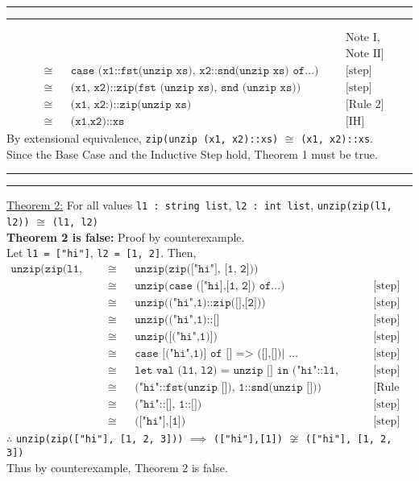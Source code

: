 \documentclass[11pt]{article}
\newcounter{questionCounter}
\newcounter{partCounter}[questionCounter]
\newenvironment{question}[2][\arabic{questionCounter}]{%
    \setcounter{partCounter}{0}%
    \vspace{.25in} \hrule \vspace{0.5em}%
        \noindent{\bf #2}%
    \vspace{0.8em} \hrule \vspace{.10in}%
    \addtocounter{questionCounter}{1}%
}{}
\begin{document}
\begin{question}{Task 2.1}
\begin{align*}
    & && &&& \text{Note I,}\\
    & && &&& \text{Note II]}\\
    &\cong && \texttt{case (x1::fst(unzip xs), x2::snd(unzip xs) of}\dots\texttt{)} &&& \text{[step]}\\
    &\cong && \texttt{(x1, x2)::zip(fst (unzip xs), snd (unzip xs))} &&& \text{[step]}\\
    &\cong && \texttt{(x1, x2:)::zip(unzip xs)} &&& \text{[Rule 2]}\\
    &\cong && \texttt{(x1,x2)::xs} &&& \text{[IH]}
\end{align*}
By extensional equivalence, \verb!zip(unzip (x1, x2)::xs)! $\cong$ \verb!(x1, x2)::xs!.\\
Since the Base Case and the Inductive Step hold, Theorem 1 must be true.
\end{question}

\newpage

\begin{question}{Task 2.2}
\underline{Theorem 2:} For all values \verb!l1 : string list!, \verb!l2 : int list!, \verb!unzip(zip(l1, l2))! $\cong$ \verb!(l1, l2)!\\
\textbf{Theorem 2 is false:} Proof by counterexample.\\
Let \verb!l1 = ["hi"]!, \verb!l2 = [1, 2]!. Then,
\begin{align*}
    \texttt{unzip(zip(l1, l2))} &\cong && \texttt{unzip(zip(["hi"], [1, 2]))} &&&\\
    &\cong && \texttt{unzip(case (["hi],[1, 2]) of}\dots\texttt{)} &&& \text{[step]}\\
    &\cong && \texttt{unzip(("hi",1)::zip([],[2]))} &&& \text{[step]}\\
    &\cong && \texttt{unzip(("hi",1)::[]} &&& \text{[step]}\\
    &\cong && \texttt{unzip([("hi",1)])} &&& \text{[step]}\\
    &\cong && \texttt{case [("hi",1)] of [] => ([],[])| }\dots\ &&& \text{[step]}\\
    &\cong && \texttt{let val (l1, l2) = unzip [] in ("hi"::l1, 1::l2) end} &&& \text{[step]}\\
    &\cong && \texttt{("hi"::fst(unzip []), 1::snd(unzip []))} &&& \text{[Rule 1]}\\
    &\cong && \texttt{("hi"::[], 1::[])} &&& \text{[step]}\\
    &\cong && \texttt{(["hi"],[1])} &&& \text{[step]}
\end{align*}
$\therefore$ \verb!unzip(zip(["hi"], [1, 2, 3]))! $\implies$ \verb!(["hi"],[1])! $\not\cong$ \verb!(["hi"], [1, 2, 3])!\\
Thus by counterexample, Theorem 2 is false.
\end{question}
\end{document}
